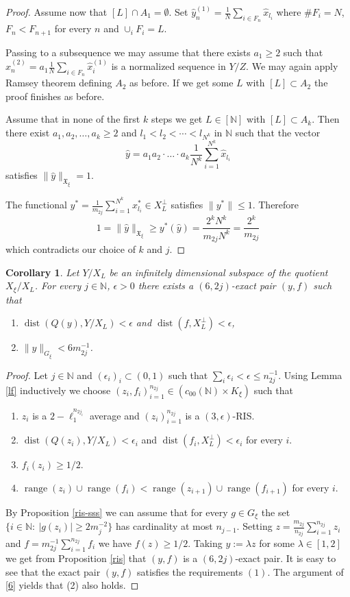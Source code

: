 \documentclass[a4paper]{amsart}
\theoremstyle{plain}
\newtheorem{corollary}[theorem]{Corollary}
\newcommand{\N}{\mathbb{N}}
\newcommand{\e}{\epsilon}
\newcommand{\norm}[1][\cdot]{\lVert #1\rVert}
\DeclareMathOperator{\ran}{range}
\DeclareMathOperator{\dist}{dist}
\begin{document}
\begin{proof}
Assume now that  $[L]\cap A_{1}=\emptyset$. Set $\widehat{y}_{n}^{(1)}=\frac{1}{N}\sum_{i\in F_n}\widehat{x}_{l_{i}}$
where  $\# F_{i}=N$, $F_{n}<F_{n+1}$ for every $n$  and $\cup_{i}F_{i}=L$.

Passing to a  subsequence we may assume that  there exists $a_1\geq 2$ such that
$\widehat{x}_{n}^{(2)}=a_{1}\frac{1}{N}\sum_{i\in F_n}\widehat{x}_{i}^{(1)}$
is a normalized  sequence in $Y/Z$.
We may again apply Ramsey theorem defining $A_{2}$ as before. If we get
some  $L$ with $[L]\subset A_{2}$ the proof finishes as before.

Assume that  in none of the first $k$ steps we  get  $L\in[\N]$ with $[L]\subset A_{k}$.
Then there exist $a_1,a_2,\ldots,a_k\ge
 2$ and $l_1<l_2<\cdots<l_{N^k}$ in $\N$ such that the vector
$$
\widehat{y}=a_1a_2\cdot\ldots\cdot
 a_k\frac{1}{N^{k}}\sum\limits_{i=1}^{N^{k}}\widehat{x}_{l_i}
$$
satisfies $\norm[\widehat{y}]_{\mathfrak{X}_\xi}=1$.

The functional $y^{*}=\frac{1}{m_{2j}}\sum\limits_{i=1}^{N^{k}}x_{l_i}^{*}\in
X_{L}^{\perp}$ satisfies $\norm[y^{*}]\le 1$. Therefore
$$
1=\norm[\widehat{y}]_{\mathfrak{X}_\xi}\geq y^{*}(\widehat{y}) =\frac{2^kN^k}{m_{2j}N^k}
=\frac{2^k}{m_{2j}}
$$
which contradicts  our choice of $k$ and $j$.
\end{proof}
\begin{corollary}\label{cf}
Let $Y/X_{L}$ be an infinitely dimensional subspace of the quotient $X_{\xi}/X_L$. For
every $j\in\N$, $\e>0$ there exists a $(6,2j)$-exact pair $(y,f)$ such that
\begin{enumerate}
 \item $\dist(Q(y),Y/X_L)<\e$ and $\dist(f, X_{L}^{\perp})<\e$,
\item $\norm[y]_{G_{\xi}}<6m_{2j}^{-1}$.
\end{enumerate}
\end{corollary}
\begin{proof}
Let $j\in\N$ and $(\e_{i})_{i}\subset (0,1)$ such that $\sum_{i}\e_{i}<\e\leq n_{2j}^{-1}$.
Using Lemma \ref{lf} inductively we choose $(z_{i},f_{i})_{i=1}^{n_{2j}}\in (c_{00}(\N)\times K_{\xi})$
such that
\begin{enumerate}
\item[a)] $z_{i}$ is a  $2-\ell_{1}^{n_{2j_i}}$ average and $(z_{i})_{i=1}^{n_{2j}}$ is a
$(3,\e)$-RIS.
 \item[b)]  $\dist(Q(z_{i}), Y/X_L)<\e_i$ and  $\dist(f_i,X_{L}^{\perp})<\e_i$ for every $i$.
\item[c)] $f_i(z_i)\geq 1/2$.
\item[d)] $\ran(z_{i})\cup\ran(f_{i})<\ran (z_{i+1})\cup\ran(f_{i+1})$ for every $i$.
\end{enumerate}
By Proposition \ref{ris-sss} we can assume that
for every  $g\in G_{\xi}$ the  set $\{i\in\N:\ \vert g(z_i)\vert\geq2m_{j}^{-2}\}$  has
cardinality at most $n_{j-1}$. Setting
$z=\frac{m_{2j}}{n_{2j}}\sum_{i=1}^{n_{2j}}z_{i}$ and
$f=m_{2j}^{-1}\sum_{i=1}^{n_{2j}}f_{i}$ we have $f(z)\geq 1/2$.
Taking $y:=\lambda z$ for some $\lambda\in [1,2]$ we get from
Proposition \ref{ris}  that  $(y,f)$ is a $(6,2j)$-exact pair.
It is easy to see that the exact pair $(y,f)$ satisfies the
requirements $(1)$.
The argument of \eqref{6} yields that (2) also holds.
\end{proof}
\end{document}

